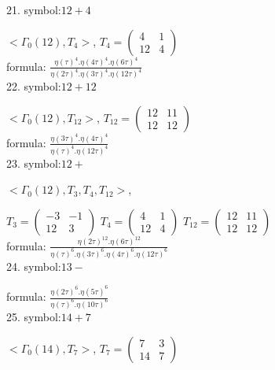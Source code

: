 21. symbol:$ 12+4 $

$ < \Gamma_0 ( 12 ), T_{4} >  $,
$
T_{4} = 
\left(
\begin{array}{cc}
4 & 1 \\
12 & 4
\end{array}
\right)
$
\\

formula: 
$ \frac{\eta(\tau)^4 . \eta(4\tau)^4. \eta(6\tau)^4}{\eta(2\tau)^4 . \eta(3\tau)^4. \eta(12\tau)^4} $
\\

22. symbol:$ 12+12 $

$ < \Gamma_0 ( 12 ), T_{12} >  $,
$
T_{12} = 
\left(
\begin{array}{cc}
12 & 11 \\
12 & 12
\end{array}
\right)
$
\\

formula: 
$ \frac{\eta(3\tau)^4 . \eta(4\tau)^4}{\eta(\tau)^4 . \eta(12\tau)^4} $
\\

23. symbol:$ 12+ $

$ < \Gamma_0 ( 12 ), T_{3}, T_{4}, T_{12} >  $,

$
T_{3} = 
\left(
\begin{array}{cc}
-3 & -1 \\
12 & 3
\end{array}
\right)
$
$
T_{4} = 
\left(
\begin{array}{cc}
4 & 1 \\
12 & 4
\end{array}
\right)
$
$
T_{12} = 
\left(
\begin{array}{cc}
12 & 11 \\
12 & 12
\end{array}
\right)
$
\\

formula: 
$ \frac{\eta(2\tau)^{12} . \eta(6\tau)^{12}}{\eta(\tau)^6 . \eta(3\tau)^6. \eta(4\tau)^6. \eta(12\tau)^6} $
\\

24. symbol:$ 13- $

formula: 
$ \frac{\eta(2\tau)^6 . \eta(5\tau)^6}{\eta(\tau)^6 . \eta(10\tau)^6} $
\\

25. symbol:$ 14+7 $

$ < \Gamma_0 ( 14 ), T_{7} >  $,
$
T_{7} = 
\left(
\begin{array}{cc}
7 & 3 \\
14 & 7
\end{array}
\right)
$
\\

